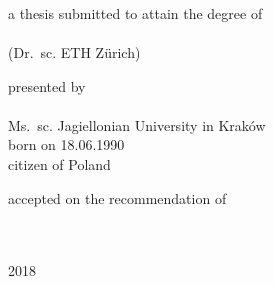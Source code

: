 
\begin{titlepage}

\begin{addmargin}[-1cm]{-3cm}
\begin{center}
\large

\hfill
\vfill


\vfill

\begingroup
\color{Maroon}
\\
\smallskip
{\normalsize {}}\\
\smallskip
{} \\
\bigskip %
\endgroup

\vfill

a thesis submitted to attain the degree of \\
\bigskip
{} \\
\smallskip
{\small (Dr.\ sc. ETH Zürich)}

\vfill

presented by \\
\bigskip
\spacedallcaps{\myName} \\
\bigskip
{\small Ms.\ sc. Jagiellonian University in Kraków \\
\smallskip
born on 18.06.1990 \\
\smallskip
citizen of Poland}

\vfill

accepted on the recommendation of \\
\bigskip
{} \\
\smallskip
{} \\
\smallskip
{}

\vfill

2018

\vfill

\end{center}
\end{addmargin}

\end{titlepage}
